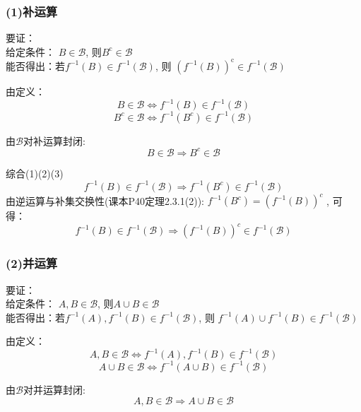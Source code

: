 \documentclass[10pt,a4paper]{article}
\begin{document}
\subsubsection{(1)补运算}

\begin{shaded}

	要证：\\
	给定条件： $ B\in\mathscr{B} $, 则$ B^{\mathrm{c}}\in\mathscr{B} $ \\
	能否得出：若$ f^{-1}(B)\in f^{-1}(\mathscr{B}) $,  
	则 $ {(f^{-1}(B))}^{\mathrm{c}} \in f^{-1}(\mathscr{B}) $

\end{shaded}

	由定义：
	\[ 
	B\in\mathscr{B} \iff f^{-1}(B)\in f^{-1}(\mathscr{B}) 
	\tag{1} 
	\] 
	\[ 
	B^{c}\in\mathscr{B} \iff f^{-1}(B^c)\in f^{-1}(\mathscr{B})
	\tag{2} 
	\] 
	
	由$ \mathscr{B} $对补运算封闭:  
	\[ 
	B\in\mathscr{B} \Rightarrow B^{c}\in\mathscr{B}  
	\tag{3} 
	\]

	综合(1)(2)(3)
	\[ 
	f^{-1}(B)\in f^{-1}(\mathscr{B})  \Rightarrow f^{-1}(B^c)\in f^{-1}(\mathscr{B})
	\]
	由逆运算与补集交换性(课本P40定理2.3.1(2)): $  f^{-1}(B^c)={(f^{-1}(B))}^c  $ , 可得：
	\[ 
	f^{-1}(B)\in f^{-1}(\mathscr{B})  \Rightarrow {(f^{-1}(B))}^c \in f^{-1}(\mathscr{B})
	\]

\subsubsection{(2)并运算}

\begin{shaded}
	
	要证：\\
	给定条件： $ A,B\in\mathscr{B} $, 则$ A \cup B \in\mathscr{B} $ \\
	能否得出：若$ f^{-1}(A),f^{-1}(B)\in f^{-1}(\mathscr{B}) $,  
	则 $ f^{-1}(A) \cup f^{-1}(B) \in f^{-1}(\mathscr{B}) $
	
\end{shaded}

由定义：
\[ 
A,B\in\mathscr{B} \iff f^{-1}(A),f^{-1}(B)\in f^{-1}(\mathscr{B}) 
\tag{1} 
\] 
\[ 
A \cup B \in\mathscr{B} \iff f^{-1}(A \cup B) \in f^{-1}(\mathscr{B})
\tag{2} 
\] 

由$ \mathscr{B} $对并运算封闭:  
\[ 
A,B\in\mathscr{B} \Rightarrow A \cup B \in\mathscr{B}
\tag{3} 
\]
\end{document}
